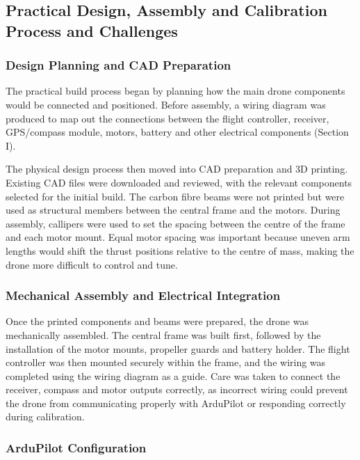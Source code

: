 \documentclass[conference]{IEEEtran}
\begin{document}
\subsection*{Practical Design, Assembly and Calibration Process and Challenges }

\subsubsection*{Design Planning and CAD Preparation}

The practical build process began by planning how the main drone components would be connected and positioned. Before assembly, a wiring diagram was produced to map out the connections between the flight controller, receiver, GPS/compass module, motors, battery and other electrical components (Section I).

The physical design process then moved into CAD preparation and 3D printing. Existing CAD files were downloaded and reviewed, with the relevant components selected for the initial build. The carbon fibre beams were not printed but were used as structural members between the central frame and the motors. During assembly, callipers were used to set the spacing between the centre of the frame and each motor mount. Equal motor spacing was important because uneven arm lengths would shift the thrust positions relative to the centre of mass, making the drone more difficult to control and tune.

\subsubsection*{Mechanical Assembly and Electrical Integration}
Once the printed components and beams were prepared, the drone was mechanically assembled. The central frame was built first, followed by the installation of the motor mounts, propeller guards and battery holder. The flight controller was then mounted securely within the frame, and the wiring was completed using the wiring diagram as a guide. Care was taken to connect the receiver, compass and motor outputs correctly, as incorrect wiring could prevent the drone from communicating properly with ArduPilot or responding correctly during calibration.


\subsubsection*{ArduPilot Configuration}
\end{document}
